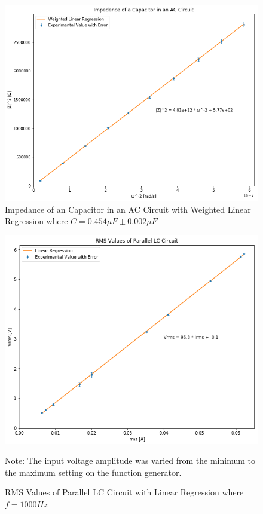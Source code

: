\documentclass[]{article}
\newcommand{\getMeasuredC}{$C = 0.454 \mu F \pm 0.002 \mu F $}
\newcommand{\getFrequency}{$f = 1000 Hz$}
\begin{document}
\begin{figure}[H]
    \includegraphics[width=\textwidth]{cap.png}
    \caption{Impedance of an Capacitor in an AC Circuit with Weighted Linear
    Regression where \getMeasuredC}\label{fig:cap}
\end{figure}

\begin{figure}[H]
    \label{fig:par}
    \includegraphics[width=\textwidth]{par.png}
    \caption{RMS Values of Parallel LC Circuit with Linear Regression where
    \getFrequency}

    Note: The input voltage amplitude was varied from the minimum to the maximum
    setting on the function generator.
\end{figure}
\end{document}
